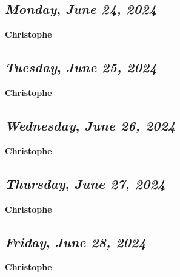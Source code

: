 \def\day{\textit{June 24, 2024}}
\def\weekday{\textit{Monday}}
\subsection*{\weekday, \day}
\textbf {Christophe}

\def\day{\textit{June 25, 2024}}
\def\weekday{\textit{Tuesday}}
\subsection*{\weekday, \day}
\textbf {Christophe}

\def\day{\textit{June 26, 2024}}
\def\weekday{\textit{Wednesday}}
\subsection*{\weekday, \day}
\textbf {Christophe}

\def\day{\textit{June 27, 2024}}
\def\weekday{\textit{Thursday}}
\subsection*{\weekday, \day}
\textbf {Christophe}

\def\day{\textit{June 28, 2024}}
\def\weekday{\textit{Friday}}
\subsection*{\weekday, \day}
\textbf {Christophe}